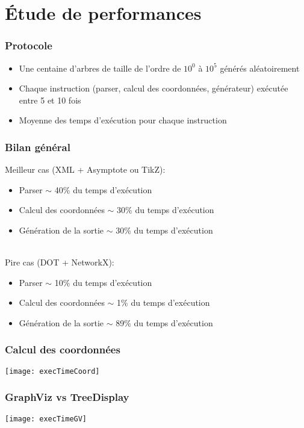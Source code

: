\section{Étude de performances}

\begin{frame}
	\frametitle{Protocole}
	\begin{itemize}
		\item Une centaine d'arbres de taille de l'ordre de $10^{0}$ à $10^{5}$ générés aléatoirement
		\item Chaque instruction (parser, calcul des coordonnées, générateur) exécutée entre 5 et 10 fois
		\item Moyenne des temps d'exécution pour chaque instruction
	\end{itemize}
\end{frame}

\begin{frame}
	\frametitle{Bilan général}
	Meilleur cas (XML + Asymptote ou TikZ):
	\begin{itemize}
		\item Parser $\sim$ 40\% du temps d'exécution
		\item Calcul des coordonnées $\sim$ 30\% du temps d'exécution
		\item Génération de la sortie $\sim$ 30\% du temps d'exécution
	\end{itemize}
	~\\
	Pire cas (DOT + NetworkX):
	\begin{itemize}
		\item Parser $\sim$ 10\% du temps d'exécution
		\item Calcul des coordonnées $\sim$ 1\% du temps d'exécution
		\item Génération de la sortie $\sim$ 89\% du temps d'exécution
	\end{itemize}
\end{frame}

\begin{frame}
	\frametitle{Calcul des coordonnées}
	\begin{center}
	\texttt{[image: execTimeCoord]}
	\end{center}
\end{frame}

\begin{frame}
	\frametitle{GraphViz vs TreeDisplay}
	\begin{center}
	\texttt{[image: execTimeGV]}
	\end{center}
\end{frame}



